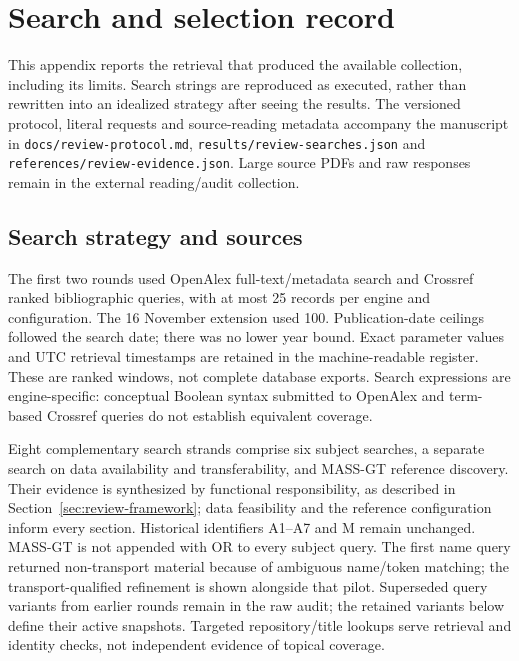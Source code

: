 \section{Search and selection record}\label{app:search}

This appendix reports the retrieval that produced the available collection,
including its limits. Search strings are reproduced as executed, rather than
rewritten into an idealized strategy after seeing the results. The versioned
protocol, literal requests and source-reading metadata accompany the manuscript
in \texttt{docs/review-protocol.md}, \texttt{results/review-searches.json} and
\texttt{references/review-evidence.json}. Large source PDFs and raw responses
remain in the external reading/audit collection.

\subsection{Search strategy and sources}
The first two rounds used OpenAlex full-text/metadata search and Crossref ranked
bibliographic queries, with at most 25 records per engine and configuration.
The 16 November extension used 100. Publication-date ceilings followed the
search date; there was no lower year bound. Exact parameter values and UTC
retrieval timestamps are retained in the machine-readable register. These are
ranked windows, not complete database exports. Search expressions are
engine-specific: conceptual Boolean syntax submitted to OpenAlex and term-based
Crossref queries do not establish equivalent coverage.

Eight complementary search strands comprise six subject searches, a separate
search on data availability and transferability, and MASS-GT reference discovery.
Their evidence is synthesized by functional responsibility, as described in
Section~\ref{sec:review-framework}; data feasibility and the reference
configuration inform every section. Historical identifiers A1--A7 and M remain
unchanged. MASS-GT is not appended with OR to every subject query. The first name query returned
non-transport material because of ambiguous name/token matching; the
transport-qualified refinement is shown alongside that pilot. Superseded query
variants from earlier rounds remain in the raw audit; the retained variants
below define their active snapshots. Targeted repository/title lookups serve
retrieval and identity checks, not independent evidence of topical coverage.

